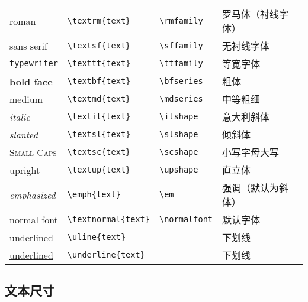 \begin{table}[h!]
	\centering
	\begin{tabular}{l l l l}
		\hline
		\textrm{roman}           & \verb|\textrm{|{\color{gray}\verb|text|}\verb|}|     & \verb|\rmfamily|   & 罗马体（衬线字体） \\
		\textsf{sans serif}      & \verb|\textsf{|{\color{gray}\verb|text|}\verb|}|     & \verb|\sffamily|   & 无衬线字体 \\
		\texttt{typewriter}      & \verb|\texttt{|{\color{gray}\verb|text|}\verb|}|     & \verb|\ttfamily|   & 等宽字体 \\
		\hline
		\textbf{bold face}       & \verb|\textbf{|{\color{gray}\verb|text|}\verb|}|     & \verb|\bfseries|   & 粗体 \\
		\textmd{medium}          & \verb|\textmd{|{\color{gray}\verb|text|}\verb|}|     & \verb|\mdseries|   & 中等粗细 \\
		\hline
		\textit{italic}          & \verb|\textit{|{\color{gray}\verb|text|}\verb|}|     & \verb|\itshape|    & 意大利斜体 \\
		\textsl{slanted}         & \verb|\textsl{|{\color{gray}\verb|text|}\verb|}|     & \verb|\slshape|    & 倾斜体 \\
		\textsc{Small Caps}      & \verb|\textsc{|{\color{gray}\verb|text|}\verb|}|     & \verb|\scshape|    & 小写字母大写 \\
		\textup{upright}         & \verb|\textup{|{\color{gray}\verb|text|}\verb|}|     & \verb|\upshape|    & 直立体 \\
		\hline
		\emph{emphasized}        & \verb|\emph{|{\color{gray}\verb|text|}\verb|}|       & \verb|\em|         & 强调（默认为斜体） \\
		\textnormal{normal font} & \verb|\textnormal{|{\color{gray}\verb|text|}\verb|}| & \verb|\normalfont| & 默认字体 \\
		\uline{underlined}       & \verb|\uline{|{\color{gray}\verb|text|}\verb|}|      &                    & 下划线 \\
		\underline{underlined}   & \verb|\underline{|{\color{gray}\verb|text|}\verb|}|  &                    & 下划线 \\
		\hline
	\end{tabular}
\end{table}

\subsection{文本尺寸}

